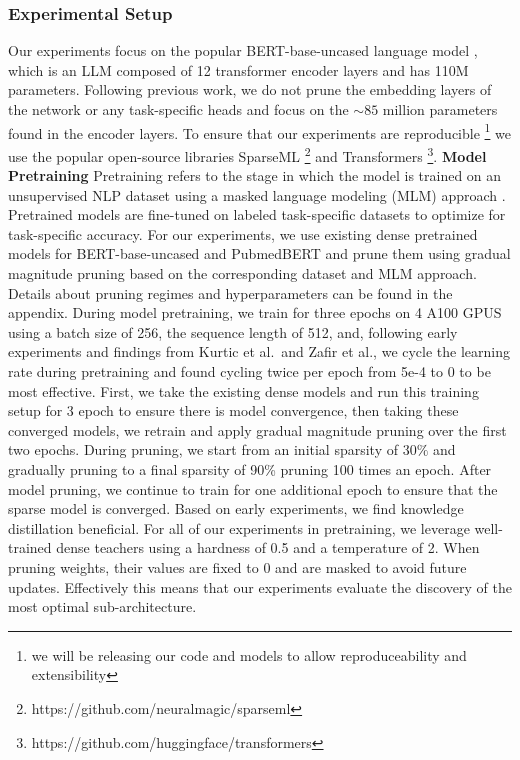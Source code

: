 \subsubsection{Experimental Setup}
Our experiments focus on the popular BERT-base-uncased language model \cite{Devlin2019BERTPO}, which is an LLM composed of 12 transformer encoder layers and has 110M parameters. Following previous work, we do not prune the embedding layers of the network or any task-specific heads and focus on the $\sim\!85$ million parameters found in the encoder layers. To ensure that our experiments are reproducible \footnote{we will be releasing our code and models to allow reproduceability and extensibility} we use the popular open-source libraries SparseML \footnote{https://github.com/neuralmagic/sparseml} and Transformers \footnote{https://github.com/huggingface/transformers}. 
\textbf{Model Pretraining}
Pretraining refers to the stage in which the model is trained on an unsupervised NLP dataset using a masked language modeling (MLM) approach \cite{Devlin2019BERTPO}. Pretrained models are fine-tuned on labeled task-specific datasets to optimize for task-specific accuracy.
For our experiments, we use existing dense pretrained models for BERT-base-uncased \cite{Devlin2019BERTPO} and PubmedBERT \cite{Gu2022DomainSpecificLM} and prune them using gradual magnitude pruning based on the corresponding dataset and MLM approach. Details about pruning regimes and hyperparameters can be found in the appendix.
During model pretraining, we train for three epochs on 4 A100 GPUS using a batch size of 256, the sequence length of 512, and, following early experiments and findings from Kurtic et al.\ and Zafir et al., we cycle the learning rate during pretraining and found cycling twice per epoch from 5e-4 to 0 to be most effective. First, we take the existing dense models and run this training setup for 3 epoch to ensure there is model convergence, then taking these converged models, we retrain and apply gradual magnitude pruning over the first two epochs. During pruning, we start from an initial sparsity of $30\%$ and gradually pruning to a final sparsity of 90\% pruning 100 times an epoch. After model pruning, we continue to train for one additional epoch to ensure that the sparse model is converged. 
Based on early experiments, we find knowledge distillation beneficial. For all of our experiments in pretraining, we leverage well-trained dense teachers using a hardness of  0.5 and a temperature of 2. When pruning weights, their values are fixed to 0 and are masked to avoid future updates. Effectively this means that our experiments evaluate the discovery of the most optimal sub-architecture.
